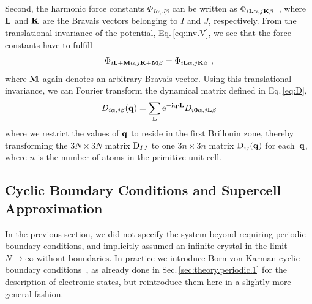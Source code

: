 Second, the harmonic force constants $\Phi_{I \alpha, J \beta}$ can be written as $\Phi_{i {\bf L} \alpha, j {\bf K} \beta}$~, where $\bf L$ and ${\bf K}$ are the Bravais vectors belonging to $I$ and $J$, respectively. From the translational invariance of the potential, Eq.\,\eqref{eq:inv.V}, we see that the force constants have to fulfill
\begin{align}
	\Phi_{i {\bf L} + \b M \alpha, j {\bf K} + \b M \beta} 
		= \Phi_{i {\bf L} \alpha, j {\bf K} \beta}~,
	\label{eq:fc.sym.1}
\end{align}
where ${\bf M}$ again denotes an arbitrary Bravais vector. Using this translational invariance, we can Fourier transform the dynamical matrix defined in Eq.\,\eqref{eq:D},
\begin{align}
	{D}_{i \alpha, j \beta} (\b q) 
		= \sum_{\b L} {\rm e}^{- \im \b q \cdot \b L} {D}_{i \b 0 \alpha, j \b L \beta}
	\label{eq:D(q)}
\end{align}
where we restrict the values of ${\bf q}$ to reside in the first Brillouin zone, thereby transforming the $3N \times 3N$ matrix ${\rm D}_{IJ}$ to one $3n \times 3n$ matrix ${\rm D}_{ij} (\bf q)$ for each~${\bf q}$, where $n$ is the number of atoms in the primitive unit cell.

\subsection{Cyclic Boundary Conditions and Supercell Approximation}
In the previous section, we did not specify the system beyond requiring periodic boundary conditions, and implicitly assumed an infinite crystal in the limit $N \to \infty$ without boundaries. In practice we introduce Born-von Karman cyclic boundary conditions~\cite{born2013atomtheorie}, as already done in Sec.\,\ref{sec:theory.periodic.1} for the description of electronic states, but reintroduce them here in a slightly more general fashion.

